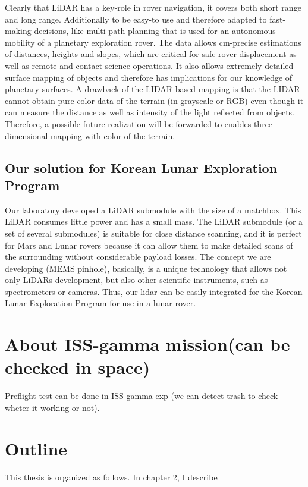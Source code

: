 Clearly that LiDAR has a key-role in rover navigation, it covers both short range and long range.
Additionally to be easy-to use and therefore adapted to fast-making decisions, like multi-path planning that is used for an
autonomous mobility of a planetary exploration rover.
The data allows cm-precise estimations of distances, heights and slopes, which are critical for safe rover displacement as well as remote and contact science operations.
It also allows extremely detailed surface mapping of objects and therefore has implications for our knowledge of planetary surfaces.
A drawback of the LIDAR-based mapping is that the LIDAR cannot obtain pure color data of the terrain (in
grayscale or RGB) even though it can measure the distance as well as intensity of the light reflected from objects.
Therefore, a possible future realization will be forwarded to enables three-dimensional mapping with color of the terrain.

\subsection{Our solution for Korean Lunar Exploration Program}
Our laboratory developed a LiDAR submodule with the size of a matchbox. This LiDAR
consumes little power and has a small mass. The LiDAR submodule (or a set of several submodules)
is suitable for close distance scanning, and it is perfect for Mars and Lunar rovers because it can
allow them to make detailed scans of the surrounding without considerable payload losses. The
concept we are developing (MEMS pinhole), basically, is a unique technology that allows not only
LiDARs development, but also other scientific instruments, such as spectrometers or cameras.
Thus, our lidar can be easily integrated for the Korean Lunar Exploration Program for use in a lunar rover.



\section{About ISS-gamma mission(can be checked in space)}
Preflight test can be done in ISS gamma exp (we can detect trash to check wheter it working or not).


\section{Outline}
This thesis is organized as follows. In chapter 2, I describe 
